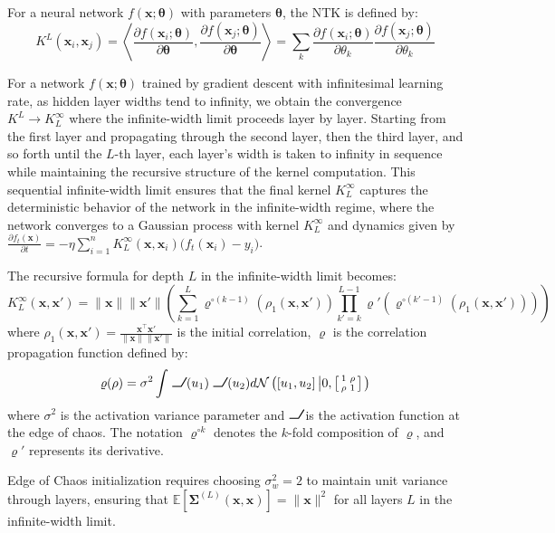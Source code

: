 \documentclass[a4paper]{article}
\DeclareRobustCommand{\ReLU}{\mathrel{\text{%
    \begin{tikzpicture}[baseline=(current bounding box.south)]
        \draw[thick] (0,0) -- (0.25,0) -- (0.4,0.25);
    \end{tikzpicture}}}\!\!}
\begin{document}
For a neural network $f(\mathbf{x}; \boldsymbol{\theta})$ with parameters $\boldsymbol{\theta}$, the NTK is defined by:
$$K^{L}(\mathbf{x}_i, \mathbf{x}_j) = \left\langle \frac{\partial f(\mathbf{x}_i; \boldsymbol{\theta})}{\partial \boldsymbol{\theta}}, \frac{\partial f(\mathbf{x}_j; \boldsymbol{\theta})}{\partial \boldsymbol{\theta}} \right\rangle = \sum_{k} \frac{\partial f(\mathbf{x}_i; \boldsymbol{\theta})}{\partial \theta_k} \frac{\partial f(\mathbf{x}_j; \boldsymbol{\theta})}{\partial \theta_k}$$

\begin{theorem}
For a network $f(\mathbf{x};\boldsymbol{\theta})$ trained by gradient descent with infinitesimal learning rate, as hidden layer widths tend to infinity, we obtain the convergence $K^{L} \to K_L^{\infty}$ where the infinite-width limit proceeds layer by layer. Starting from the first layer and propagating through the second layer, then the third layer, and so forth until the $L$-th layer, each layer's width is taken to infinity in sequence while maintaining the recursive structure of the kernel computation. This sequential infinite-width limit ensures that the final kernel $K_L^{\infty}$ captures the deterministic behavior of the network in the infinite-width regime, where the network converges to a Gaussian process with kernel $K_L^{\infty}$ and dynamics given by $\frac{\partial f_t(\mathbf{x})}{\partial t} = -\eta \sum_{i=1}^n K_L^{\infty}(\mathbf{x},\mathbf{x}_i)\bigl(f_t(\mathbf{x}_i) - y_i\bigr)$.

The recursive formula for depth $L$ in the infinite-width limit becomes:
$$K_L^{\infty}(\mathbf{x},\mathbf{x}') = \|\mathbf{x}\| \|\mathbf{x}'\| \left( \sum_{k=1}^{L} \varrho^{\circ (k-1)}\left( \rho_1(\mathbf{x},\mathbf{x}') \right) \prod_{k'=k}^{L-1} \varrho'\left( \varrho^{\circ (k'-1)}\left( \rho_1(\mathbf{x},\mathbf{x}') \right) \right) \right)$$
where $\rho_1(\mathbf{x},\mathbf{x}') = \frac{\mathbf{x}^{\top}\mathbf{x}'}{\|\mathbf{x}\| \|\mathbf{x}'\|}$ is the initial correlation, $\varrho$ is the correlation propagation function defined by:
$$\varrho(\rho) = \sigma^2 \int \ReLU(u_1) \ReLU(u_2) d\mathcal{N}\left( [u_1,u_2] \left| 0,\left[ \begin{smallmatrix} 1 & \rho \\ \rho & 1 \end{smallmatrix} \right] \right. \right)$$
where $\sigma^2$ is the activation variance parameter and $\ReLU$ is the activation function at the edge of chaos. The notation $\varrho^{\circ k}$ denotes the $k$-fold composition of $\varrho$, and $\varrho'$ represents its derivative.

Edge of Chaos initialization requires choosing $\sigma_w^2 = 2$ to maintain unit variance through layers, ensuring that $\mathbb{E}[\boldsymbol{\Sigma}^{(L)}(\mathbf{x},\mathbf{x})] = \|\mathbf{x}\|^2$ for all layers $L$ in the infinite-width limit.
\end{theorem}
\end{document}
